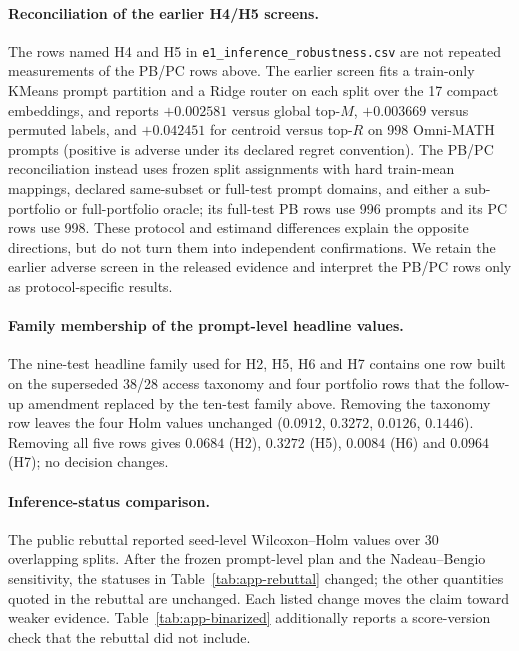 \documentclass{article}
\begin{document}
\paragraph{Reconciliation of the earlier H4/H5 screens.} The rows named H4 and H5 in \texttt{e1\_inference\_robustness.csv} are not repeated measurements of the PB/PC rows above. The earlier screen fits a train-only KMeans prompt partition and a Ridge router on each split over the 17 compact embeddings, and reports $+0.002581$ versus global top-$M$, $+0.003669$ versus permuted labels, and $+0.042451$ for centroid versus top-$R$ on 998 Omni-MATH prompts (positive is adverse under its declared regret convention). The PB/PC reconciliation instead uses frozen split assignments with hard train-mean mappings, declared same-subset or full-test prompt domains, and either a sub-portfolio or full-portfolio oracle; its full-test PB rows use 996 prompts and its PC rows use 998. These protocol and estimand differences explain the opposite directions, but do not turn them into independent confirmations. We retain the earlier adverse screen in the released evidence and interpret the PB/PC rows only as protocol-specific results.

\paragraph{Family membership of the prompt-level headline values.}
The nine-test headline family used for H2, H5, H6 and H7 contains one row built on the superseded 38/28 access taxonomy and four portfolio rows that the follow-up amendment replaced by the ten-test family above. Removing the taxonomy row leaves the four Holm values unchanged ($0.0912$, $0.3272$, $0.0126$, $0.1446$). Removing all five rows gives $0.0684$ (H2), $0.3272$ (H5), $0.0084$ (H6) and $0.0964$ (H7); no decision changes.

\paragraph{Inference-status comparison.}
The public rebuttal reported seed-level Wilcoxon--Holm values over 30 overlapping splits. After the frozen prompt-level plan and the Nadeau--Bengio sensitivity, the statuses in Table~\ref{tab:app-rebuttal} changed; the other quantities quoted in the rebuttal are unchanged. Each listed change moves the claim toward weaker evidence. Table~\ref{tab:app-binarized} additionally reports a score-version check that the rebuttal did not include.
\end{document}
